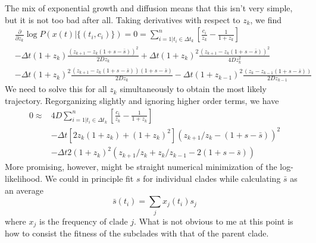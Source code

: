 \documentclass[11pt]{article}
\begin{document}
The mix of exponential growth and diffusion means that this isn't very simple, but it 
is not too bad after all. Taking derivatives with respect to $z_k$, we find
\begin{equation}
\begin{split}
    &\frac{\partial}{\partial z_k}\log P(x(t) | \{(t_i, c_i)\} )  = 0 = 
            \sum_{i=1 | t_i \in \Delta t_k}^n \left[\frac{c_i}{z_k} - \frac{1}{1+z_k}\right] \\
           &-\Delta t (1+z_k)\frac{(z_{k+1}-z_k(1+s-\bar{s}))^2}{2Dz_k}
            +\Delta t (1+z_k)^2\frac{(z_{k+1}-z_k(1+s-\bar{s}))^2}{4Dz_k^2}\\
           &-\Delta t (1+z_k)^2\frac{(z_{k+1}-z_k(1+s-\bar{s}))(1+s-\bar{s})}{2Dz_k}  
           -\Delta t (1+z_{k-1})^2\frac{(z_{k}-z_{k-1}(1+s-\bar{s}))}{2Dz_{k-1}}
\end{split}
\end{equation}
We need to solve this for all $z_k$ simultaneously to obtain the most likely trajectory. 
Regorganizing slightly and ignoring higher order terms, we have
\begin{equation}
\begin{split}
     0  \approx  &4D \sum_{i=1 | t_i \in \Delta t_k}^n \left[\frac{c_i}{z_k} - \frac{1}{1+z_k}\right] \\
           &-\Delta t \left[2z_k(1+z_k)+(1+z_k)^2\right](z_{k+1}/z_k-(1+s-\bar{s}))^2\\
           &-\Delta t 2(1+z_k)^2 (z_{k+1}/z_k+z_{k}/z_{k-1}-2(1+s-\bar{s}))  
\end{split}
\end{equation}
More promising, however, might be straight numerical minimization of the log-likelihood. 
We could in principle fit $s$ for individual clades while calculating $\bar{s}$ as an average
\begin{equation}
    \bar{s}(t_i) = \sum_j x_j(t_i)s_j
\end{equation}
where $x_j$ is the frequency of clade $j$. What is not obvious to me at this point is how to
consist the fitness of the subclades with that of the parent clade. 
\end{document}
